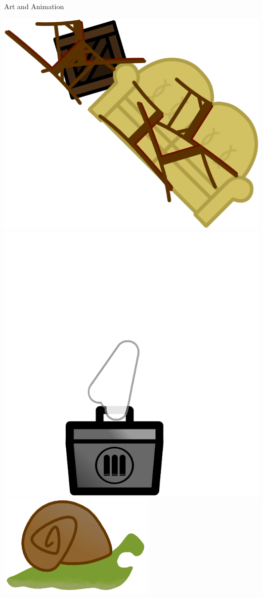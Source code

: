 \documentclass{beamer}
\begin{document}
\begin{frame}{Art and Animation}
  \begin{center}
    \includegraphics[scale=0.1]{../game/static/img/barricade_stairs.png}
    \includegraphics[scale=0.1]{../game/static/img/ghost_ammobox.png}
    \includegraphics[scale=0.15]{snail_teeth.png} \\

\end{center}
\end{frame}
\end{document}
